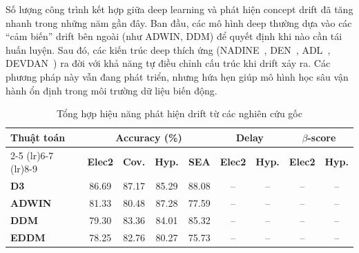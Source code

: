 Số lượng công trình kết hợp giữa deep learning và phát hiện concept drift đã tăng nhanh trong những năm gần đây. Ban đầu, các mô hình deep thường dựa vào các ``cảm biến'' drift bên ngoài (như ADWIN, DDM) để quyết định khi nào cần tái huấn luyện. Sau đó, các kiến trúc deep thích ứng (NADINE~\cite{pratama2019automatic}, DEN~\cite{yoon2018den}, ADL~\cite{ashfahani2019adl}, DEVDAN~\cite{ashfahani2020devdan}) ra đời với khả năng tự điều chỉnh cấu trúc khi drift xảy ra. Các phương pháp này vẫn đang phát triển, nhưng hứa hẹn giúp mô hình học sâu vận hành ổn định trong môi trường dữ liệu biến động.

\begin{table}[!htbp]
	\centering
	\caption{Tổng hợp hiệu năng phát hiện drift từ các nghiên cứu gốc}
	\label{tab:accuracy_results}
	\begin{threeparttable}
		\small
		\begin{tabular}{@{}lcccccccc@{}}
			\toprule
			\multirow{2}{*}{\textbf{Thuật toán}} & \multicolumn{4}{c}{\textbf{Accuracy (\%)}} & \multicolumn{2}{c}{\textbf{Delay}} & \multicolumn{2}{c}{\textbf{$\beta$-score}}                                                                                  \\
			\cmidrule(lr){2-5} \cmidrule(lr){6-7} \cmidrule(lr){8-9}
			                                     & \textbf{Elec2}                             & \textbf{Cov.}                      & \textbf{Hyp.}                              & \textbf{SEA} & \textbf{Elec2} & \textbf{Hyp.} & \textbf{Elec2} & \textbf{Hyp.} \\
			\midrule
			\textbf{D3}                          & 86.69                                      & 87.17                              & 85.29                                      & 88.08        & --             & --            & --             & --            \\
			\textbf{ADWIN}                       & 81.33                                      & 80.48                              & 87.28                                      & 77.59        & --             & --            & --             & --            \\
			\textbf{DDM}                         & 79.30                                      & 83.36                              & 84.01                                      & 85.32        & --             & --            & --             & --            \\
			\textbf{EDDM}                        & 78.25                                      & 82.76                              & 80.27                                      & 75.73        & --             & --            & --             & --            \\

\end{tabular}
\end{threeparttable}
\end{table}
